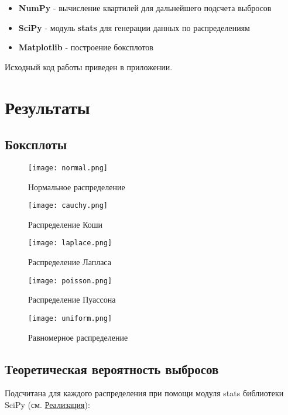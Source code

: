 \documentclass[12pt,a4paper]{article}
\begin{document}
\begin{itemize}
	\item \textbf{NumPy} - вычисление квартилей для дальнейшего подсчета выбросов
	\item \textbf{SciPy} - модуль \textbf{stats} для генерации данных по распределениям
	\item \textbf{Matplotlib} - построение боксплотов
\end{itemize}

Исходный код работы приведен в приложении. 
\pagebreak

\section{Результаты}
\subsection{Боксплоты}
\begin{figure}[h!]
	\centering
	\texttt{[image: normal.png]}
	\caption{Нормальное распределение}
	\label{fig:image}
\end{figure}

\begin{figure}[h!]
	\centering
	\texttt{[image: cauchy.png]}
	\caption{Распределение Коши}
	\label{fig:image}
\end{figure}

\pagebreak

\begin{figure}[h!]
	\centering
	\texttt{[image: laplace.png]}
	\caption{Распределение Лапласа}
	\label{fig:image}
\end{figure}

\begin{figure}[h!]
	\centering
	\texttt{[image: poisson.png]}
	\caption{Распределение Пуассона}
	\label{fig:image}
\end{figure}

\pagebreak

\begin{figure}[h!]
	\centering
	\texttt{[image: uniform.png]}
	\caption{Равномерное распределение}
	\label{fig:image}
\end{figure}
\pagebreak

\subsection{Теоретическая вероятность выбросов}
Подсчитана для каждого распределения при помощи модуля {stats} библиотеки {SciPy} (см. \hyperref[sec:impl]{Реализация}):
\end{document}
